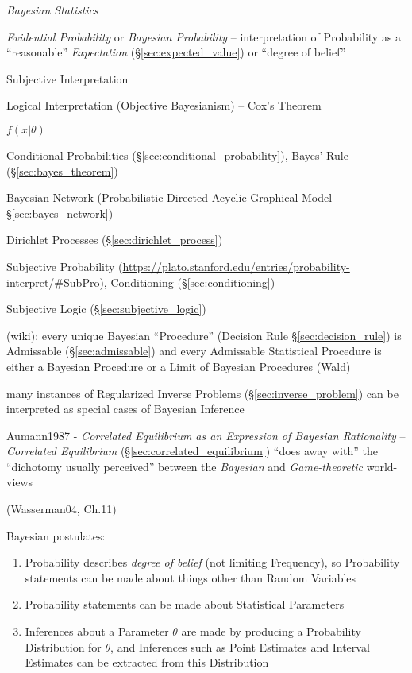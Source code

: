 \emph{Bayesian Statistics}

\emph{Evidential Probability} or \emph{Bayesian Probability} -- interpretation
of Probability as a ``reasonable'' \emph{Expectation}
(\S\ref{sec:expected_value}) or ``degree of belief''

Subjective Interpretation

Logical Interpretation (Objective Bayesianism) -- Cox's Theorem

$f(x | \theta)$

Conditional Probabilities (\S\ref{sec:conditional_probability}), Bayes' Rule
(\S\ref{sec:bayes_theorem})

\fist Bayesian Network (Probabilistic Directed Acyclic Graphical Model
\S\ref{sec:bayes_network})

\fist Dirichlet Processes (\S\ref{sec:dirichlet_process})

Subjective Probability %
(\url{https://plato.stanford.edu/entries/probability-interpret/#SubPro}),
Conditioning (\S\ref{sec:conditioning})

\fist Subjective Logic (\S\ref{sec:subjective_logic})

(wiki): every unique Bayesian ``Procedure'' (Decision Rule
\S\ref{sec:decision_rule}) is Admissable (\S\ref{sec:admissable}) and every
Admissable Statistical Procedure is either a Bayesian Procedure or a Limit of
Bayesian Procedures (Wald)

many instances of Regularized Inverse Problems (\S\ref{sec:inverse_problem}) can
be interpreted as special cases of Bayesian Inference

\fist Aumann1987 - \emph{Correlated Equilibrium as an Expression of Bayesian
  Rationality} -- \emph{Correlated Equilibrium}
(\S\ref{sec:correlated_equilibrium}) ``does away with'' the ``dichotomy usually
perceived'' between the \emph{Bayesian} and \emph{Game-theoretic} world-views

(Wasserman04, Ch.11)

Bayesian postulates:
\begin{enumerate}
  \item Probability describes \emph{degree of belief} (not limiting Frequency),
    so Probability statements can be made about things other than Random
    Variables
  \item Probability statements can be made about Statistical Parameters
  \item Inferences about a Parameter $\theta$ are made by producing a
    Probability Distribution for $\theta$, and Inferences such as Point
    Estimates and Interval Estimates can be extracted from this Distribution
\end{enumerate}

